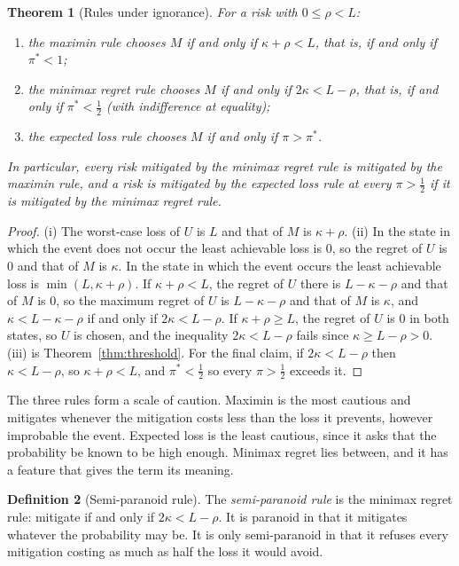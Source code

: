 \documentclass[11pt]{article}
\theoremstyle{plain}
\newtheorem{theorem}{Theorem}[section]
\theoremstyle{definition}
\newtheorem{definition}[theorem]{Definition}
\theoremstyle{remark}
\begin{document}
\begin{theorem}[Rules under ignorance]\label{thm:rules}
For a risk with $0\le\rho<L$:
\begin{enumerate}
\item[(i)] the maximin rule chooses $M$ if and only if $\kappa+\rho<L$, that is, if and only if $\pi^{*}<1$;
\item[(ii)] the minimax regret rule chooses $M$ if and only if $2\kappa<L-\rho$, that is, if and only if $\pi^{*}<\tfrac12$ (with indifference at equality);
\item[(iii)] the expected loss rule chooses $M$ if and only if $\pi>\pi^{*}$.
\end{enumerate}
In particular, every risk mitigated by the minimax regret rule is mitigated by the maximin rule, and a risk is mitigated by the expected loss rule at every $\pi>\tfrac12$ if it is mitigated by the minimax regret rule.
\end{theorem}

\begin{proof}
(i) The worst-case loss of $U$ is $L$ and that of $M$ is $\kappa+\rho$. (ii) In the state in which the event does not occur the least achievable loss is $0$, so the regret of $U$ is $0$ and that of $M$ is $\kappa$. In the state in which the event occurs the least achievable loss is $\min(L,\kappa+\rho)$. If $\kappa+\rho<L$, the regret of $U$ there is $L-\kappa-\rho$ and that of $M$ is $0$, so the maximum regret of $U$ is $L-\kappa-\rho$ and that of $M$ is $\kappa$, and $\kappa<L-\kappa-\rho$ if and only if $2\kappa<L-\rho$. If $\kappa+\rho\ge L$, the regret of $U$ is $0$ in both states, so $U$ is chosen, and the inequality $2\kappa<L-\rho$ fails since $\kappa\ge L-\rho>0$. (iii) is Theorem~\ref{thm:threshold}. For the final claim, if $2\kappa<L-\rho$ then $\kappa<L-\rho$, so $\kappa+\rho<L$, and $\pi^{*}<\tfrac12$ so every $\pi>\tfrac12$ exceeds it. \qedhere
\end{proof}

The three rules form a scale of caution. Maximin is the most cautious and mitigates whenever the mitigation costs less than the loss it prevents, however improbable the event. Expected loss is the least cautious, since it asks that the probability be known to be high enough. Minimax regret lies between, and it has a feature that gives the term its meaning.

\begin{definition}[Semi-paranoid rule]\label{def:semi}
The \emph{semi-paranoid rule} is the minimax regret rule: mitigate if and only if $2\kappa<L-\rho$. It is paranoid in that it mitigates whatever the probability may be. It is only semi-paranoid in that it refuses every mitigation costing as much as half the loss it would avoid.
\end{definition}
\end{document}
